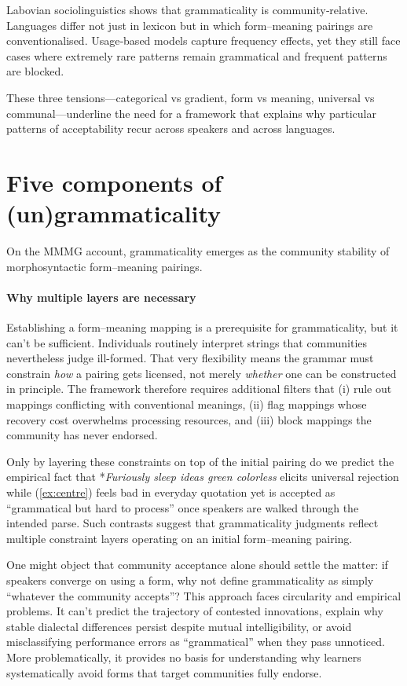 \documentclass[12pt]{article}
\begin{document}
Labovian sociolinguistics \parencite{labov1972} shows that grammaticality is community‑relative.  Languages differ not just in lexicon but in which form–meaning pairings are conventionalised.  Usage‑based models capture frequency effects, yet they still face cases where extremely rare patterns remain grammatical and frequent patterns are blocked.

\medskip
These three tensions—categorical vs gradient, form vs meaning, universal vs communal—underline the need for a framework that explains why particular patterns of acceptability recur across speakers and across languages.


\section{Five components of (un)grammaticality}

On the MMMG account, grammaticality emerges as the community stability of morphosyntactic form–meaning pairings.

\paragraph{Why multiple layers are necessary}
Establishing a form–meaning mapping is a prerequisite for grammaticality, but it can't be sufficient. Individuals routinely interpret strings that communities nevertheless judge ill-formed. That very flexibility means the grammar must constrain \emph{how} a pairing gets licensed, not merely \emph{whether} one can be constructed in principle. The framework therefore requires additional filters that (i) rule out mappings conflicting with conventional meanings, (ii) flag mappings whose recovery cost overwhelms processing resources, and (iii) block mappings the community has never endorsed.

Only by layering these constraints on top of the initial pairing do we predict the empirical fact that *\textit{Furiously sleep ideas green colorless} elicits universal rejection while (\ref{ex:centre}) feels bad in everyday quotation yet is accepted as \enquote{grammatical but hard to process} once speakers are walked through the intended parse.  Such contrasts suggest that grammaticality judgments reflect multiple constraint layers operating on an initial form–meaning pairing.

One might object that community acceptance alone should settle the matter: if speakers converge on using a form, why not define grammaticality as simply \enquote{whatever the community accepts}? This approach faces circularity and empirical problems. It can't predict the trajectory of contested innovations, explain why stable dialectal differences persist despite mutual intelligibility, or avoid misclassifying performance errors as \enquote{grammatical} when they pass unnoticed. More problematically, it provides no basis for understanding why learners systematically avoid forms that target communities fully endorse.
\end{document}
